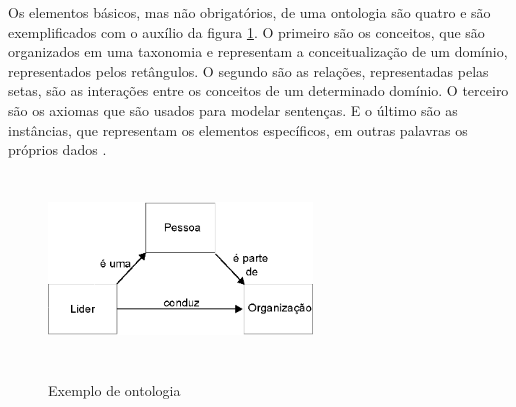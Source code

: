 Os elementos básicos, mas não obrigatórios, de uma ontologia são quatro \cite{ALMEIDA2003} e são exemplificados com o auxílio da figura \ref{figura_ontologia}. O primeiro são os conceitos, que são organizados em uma taxonomia e representam a conceitualização de um domínio, representados pelos retângulos. O segundo são as relações, representadas pelas setas, são as interações entre os conceitos de um determinado domínio. O terceiro são os axiomas que são usados para modelar sentenças. E o último são as instâncias, que representam os elementos específicos, em outras palavras os próprios dados \cite{ALMEIDA2003}. 
\begin{figure}[!hbt]
    \centering   
    \caption{Exemplo de ontologia}
    \includegraphics[width=7cm, height=5cm]{./secoes/conceitosFundamentais/pics/img/Ontologia.eps}
	\label{figura_ontologia}
\end{figure}

